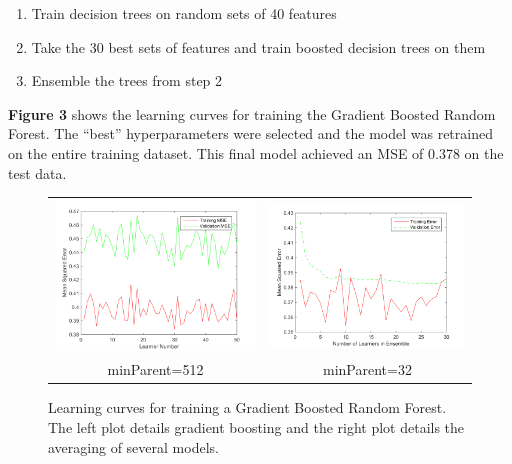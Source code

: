 \documentclass[12pt] {article}
\renewcommand{\baselinestretch}{1.5} %
\begin{document}
\begin{enumerate}
\item Train decision trees on random sets of 40 features
\item Take the 30 best sets of features and train boosted decision trees on them
\item Ensemble the trees from step 2
\end{enumerate}

\textbf{Figure 3} shows the learning curves for training the Gradient Boosted Random Forest. The ``best'' hyperparameters were selected and the model was retrained on the entire training dataset. This final model achieved an MSE of 0.378 on the test data.

\renewcommand{\baselinestretch}{1.0} %
\begin{figure}[h!] \centering
\begin{tabular}{cc}
\includegraphics[width=.45\textwidth]{figdir/learnerNumVersusMSE.png} &
\includegraphics[width=.45\textwidth]{figdir/numLearnersVersusMSE2.png} \\
minParent=512 & minParent=32 \\
\end{tabular}
\caption{Learning curves for training a Gradient Boosted Random Forest. The left plot details gradient boosting and the right plot details the averaging of several models.}
\end{figure}
\renewcommand{\baselinestretch}{1.5} %
\end{document}
